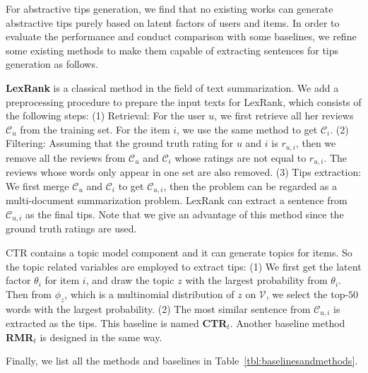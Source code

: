 \documentclass[sigconf]{acmart}
\begin{document}
For abstractive tips generation, we find that no existing works can generate abstractive tips purely based on latent factors of users and items.
In order to evaluate the performance and conduct comparison with some baselines, we refine some existing methods to make them capable of extracting sentences for tips generation as follows.

\textbf{LexRank} \cite{erkan2004lexrank} is a classical method in the field of text summarization.
We add a preprocessing procedure to prepare the input texts for LexRank, which consists of the following steps: (1) Retrieval: For the user $u$, we first retrieve all her reviews $\mathcal{C}_u$ from the training set. For the item $i$, we use the same method to get $\mathcal{C}_i$. (2) Filtering: Assuming that the ground truth rating for $u$ and $i$ is $r_{u,i}$, then we remove all the reviews from $\mathcal{C}_u$ and $\mathcal{C}_i$ whose ratings are not equal to $r_{u,i}$. The reviews whose words only appear in one set are also removed.
(3) Tips extraction: We first merge $\mathcal{C}_u$ and $\mathcal{C}_i$ to get $\mathcal{C}_{u,i}$, then the problem can be regarded as a multi-document summarization problem. LexRank can extract a sentence from $\mathcal{C}_{u,i}$ as the final tips. Note that we give an advantage of this method since the ground truth ratings are used.

CTR contains a topic model component and it can generate topics for items. So the topic related variables are employed to extract tips: (1) We first get the latent factor $\theta_i$ for item $i$, and draw the topic $z$ with the largest probability from $\theta_i$. Then from $\phi_z$, which is a multinomial distribution of $z$ on $\mathcal{V}$, we select the top-$50$ words with the largest probability. (2) The most similar sentence from $\mathcal{C}_{u,i}$ is extracted as the tips. This baseline is named \textbf{CTR$_t$}.
Another baseline method \textbf{RMR$_t$} is designed in the same way.

Finally, we list all the methods and baselines in Table~\ref{tbl:baselinesandmethods}.
\end{document}
